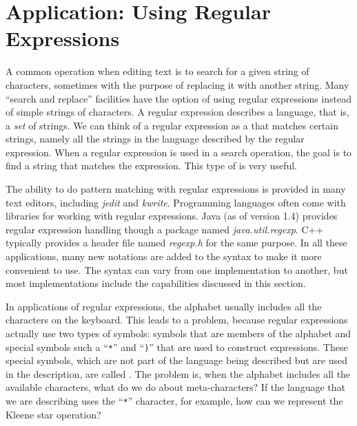 \section{Application: Using Regular Expressions}

\newcommand{\bk}{\char`\\}
\newcommand{\vb}{\char`\|}
\newcommand{\sol}{\char`\^}

A common operation when editing text is to search for a
given string of characters, sometimes with the purpose of
replacing it with another string.  Many ``search and replace'' facilities have the option of using regular expressions
instead of simple strings of characters.  A regular expression describes
a language, that is, a \textit{set} of strings.  We can think of a regular
expression as a  that matches certain strings, namely all
the strings in the language described by the regular expression.
When a regular expression is used in a search operation, the
goal is to find a string that matches the expression.  This type
of  is very useful.

The ability to do pattern matching with regular expressions is provided
in many text editors, including \textit{jedit} and \textit{kwrite}.
Programming languages often come with libraries for working with
regular expressions.  Java (as of version 1.4) provides regular
expression handling though a package named \textit{java.util.regexp}.
C++ typically provides a header file named \textit{regexp.h} for
the same purpose.  In all these applications, many new notations are added to the syntax to make it
more convenient to use.  The syntax can vary from one implementation
to another, but most implementations include the capabilities
discussed in this section.

\medskip

In applications of regular expressions, the alphabet usually includes
all the characters on the keyboard.  This leads to a problem, because
regular expressions actually use two types of symbols:  symbols that
are members of the alphabet and special symbols such a ``\texttt{*}'' and ``\texttt{)}'' that
are used to construct expressions.  These special symbols, which
are not part of the language being described but are used in the
description, are called .  The problem is,
when the alphabet includes all the available characters, what do we
do about meta-characters?  If the language that we are describing 
uses the ``\texttt{*}'' character, for example, how can we represent the
Kleene star operation?

